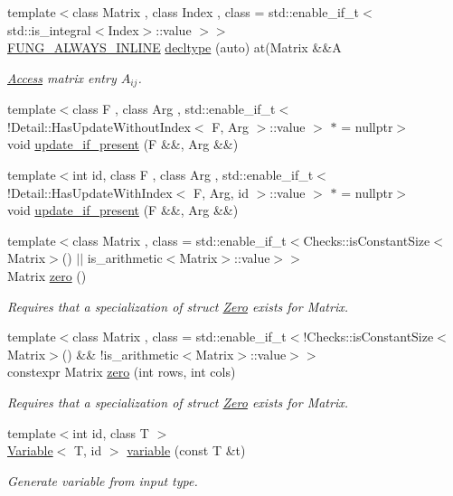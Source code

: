 \begin{DoxyCompactItemize}
{\footnotesize template$<$class Matrix , class Index , class  = std\-::enable\-\_\-if\-\_\-t$<$ std\-::is\-\_\-integral$<$\-Index$>$\-::value $>$$>$ }\\\hyperlink{macros_8hh_a03b9da186125795e5afa49d0ef1cc32f}{\-F\-U\-N\-G\-\_\-\-A\-L\-W\-A\-Y\-S\-\_\-\-I\-N\-L\-I\-N\-E} \hyperlink{namespaceFunG_a008e627afadc16205f1a9f1469af1d76}{decltype} (auto) at(\-Matrix \&\&\-A
\begin{DoxyCompactList}\small\item\em \hyperlink{namespaceFunG_1_1Access}{\-Access} matrix entry $A_{ij}$. \end{DoxyCompactList}\item 
{\footnotesize template$<$class F , class Arg , std\-::enable\-\_\-if\-\_\-t$<$!\-Detail\-::\-Has\-Update\-Without\-Index$<$ F, Arg $>$\-::value $>$ $\ast$  = nullptr$>$ }\\void \hyperlink{namespaceFunG_a3b9d2e5d07b30c2ee26703b33e9adb9e}{update\-\_\-if\-\_\-present} (\-F \&\&, \-Arg \&\&)
\item 
{\footnotesize template$<$int id, class F , class Arg , std\-::enable\-\_\-if\-\_\-t$<$!\-Detail\-::\-Has\-Update\-With\-Index$<$ F, Arg, id $>$\-::value $>$ $\ast$  = nullptr$>$ }\\void \hyperlink{namespaceFunG_aed5ddbef97c98202e818bca2b74c75d2}{update\-\_\-if\-\_\-present} (\-F \&\&, \-Arg \&\&)
\item 
{\footnotesize template$<$class Matrix , class  = std\-::enable\-\_\-if\-\_\-t$<$\-Checks\-::is\-Constant\-Size$<$\-Matrix$>$() $|$$|$ is\-\_\-arithmetic$<$\-Matrix$>$\-::value$>$$>$ }\\\-Matrix \hyperlink{namespaceFunG_a649b4470d6def401959bfea3a368c48c}{zero} ()
\begin{DoxyCompactList}\small\item\em \-Requires that a specialization of struct \hyperlink{structFunG_1_1Zero}{\-Zero} exists for \-Matrix. \end{DoxyCompactList}\item 
{\footnotesize template$<$class Matrix , class  = std\-::enable\-\_\-if\-\_\-t$<$!\-Checks\-::is\-Constant\-Size$<$\-Matrix$>$() \&\& !is\-\_\-arithmetic$<$\-Matrix$>$\-::value$>$$>$ }\\constexpr \-Matrix \hyperlink{namespaceFunG_ae633433339ba30207aa526e54e3924b4}{zero} (int rows, int cols)
\begin{DoxyCompactList}\small\item\em \-Requires that a specialization of struct \hyperlink{structFunG_1_1Zero}{\-Zero} exists for \-Matrix. \end{DoxyCompactList}\item 
{\footnotesize template$<$int id, class T $>$ }\\\hyperlink{structFunG_1_1Variable}{\-Variable}$<$ \-T, id $>$ \hyperlink{namespaceFunG_a1c474456411f028e14eab67ff6eebe0c}{variable} (const \-T \&t)
\begin{DoxyCompactList}\small\item\em \-Generate variable from input type. \end{DoxyCompactList}\end{DoxyCompactItemize}
